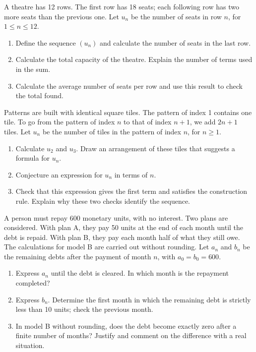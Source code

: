 A theatre has 12 rows. The first row has 18 seats; each following row has two more seats than the previous one. Let $u_n$ be the number of seats in row $n$, for $1\leq n\leq12$.
\begin{enumerate}[label=\arabic*.]
\item Define the sequence $(u_n)$ and calculate the number of seats in the last row.
\item Calculate the total capacity of the theatre. Explain the number of terms used in the sum.
\item Calculate the average number of seats per row and use this result to check the total found.
\end{enumerate}
Patterns are built with identical square tiles. The pattern of index 1 contains one tile. To go from the pattern of index $n$ to that of index $n+1$, we add $2n+1$ tiles. Let $u_n$ be the number of tiles in the pattern of index $n$, for $n\geq1$.
\begin{enumerate}[label=\arabic*.]
\item Calculate $u_2$ and $u_3$. Draw an arrangement of these tiles that suggests a formula for $u_n$.
\item Conjecture an expression for $u_n$ in terms of $n$.
\item Check that this expression gives the first term and satisfies the construction rule. Explain why these two checks identify the sequence.
\end{enumerate}
A person must repay 600 monetary units, with no interest. Two plans are considered. With plan A, they pay 50 units at the end of each month until the debt is repaid. With plan B, they pay each month half of what they still owe. The calculations for model B are carried out without rounding. Let $a_n$ and $b_n$ be the remaining debts after the payment of month $n$, with $a_0=b_0=600$.
\begin{enumerate}[label=\arabic*.]
\item Express $a_n$ until the debt is cleared. In which month is the repayment completed?
\item Express $b_n$. Determine the first month in which the remaining debt is strictly less than 10 units; check the previous month.
\item In model B without rounding, does the debt become exactly zero after a finite number of months? Justify and comment on the difference with a real situation.
\end{enumerate}
